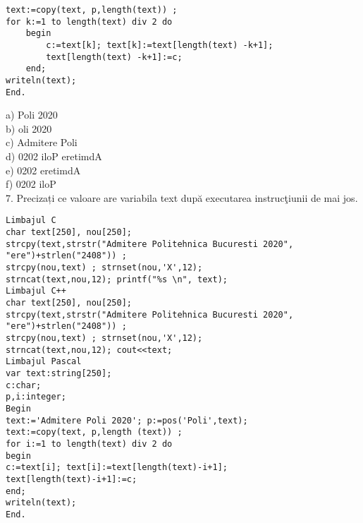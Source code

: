 \begin{verbatim}
text:=copy(text, p,length(text)) ;
for k:=1 to length(text) div 2 do
    begin
        c:=text[k]; text[k]:=text[length(text) -k+1];
        text[length(text) -k+1]:=c;
    end;
writeln(text);
End.
\end{verbatim}

a) Poli 2020\\
b) oli 2020\\
c) Admitere Poli\\
d) 0202 iloP eretimdA\\
e) 0202 eretimdA\\
f) 0202 iloP\\
7. Precizați ce valoare are variabila text după executarea instrucţiunii de mai jos.

\begin{verbatim}
Limbajul C
char text[250], nou[250];
strcpy(text,strstr("Admitere Politehnica Bucuresti 2020",
"ere")+strlen("2408")) ;
strcpy(nou,text) ; strnset(nou,'X',12);
strncat(text,nou,12); printf("%s \n", text);
Limbajul C++
char text[250], nou[250];
strcpy(text,strstr("Admitere Politehnica Bucuresti 2020",
"ere")+strlen("2408")) ;
strcpy(nou,text) ; strnset(nou,'X',12);
strncat(text,nou,12); cout<<text;
Limbajul Pascal
var text:string[250];
c:char;
p,i:integer;
Begin
text:='Admitere Poli 2020'; p:=pos('Poli',text);
text:=copy(text, p,length (text)) ;
for i:=1 to length(text) div 2 do
begin
c:=text[i]; text[i]:=text[length(text)-i+1];
text[length(text)-i+1]:=c;
end;
writeln(text);
End.
\end{verbatim}

